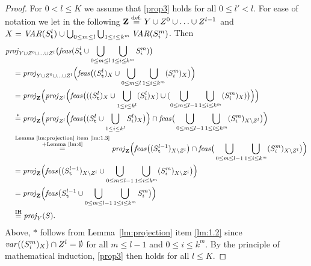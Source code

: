 \begin{proof}
For $0<l\leq K$ we assume that \eqref{prop3} holds for all $0\leq l'<l$. For ease of notation we let in the following $\mathbf{Z} \overset{\text{def.}}= Y\cup Z^0\cup\ldots\cup Z^{l-1}$ and $X = \mathit{VAR}(S^l_{\texttt{t}})\cup \bigcup_{0\leq m\leq l}\bigcup_{1\leq i\leq k^m}\mathit{VAR}(S^m_i)$. Then 
\begin{align*}
&\mathit{proj}_{Y\cup Z^0\cup\ldots\cup Z^l}\big(\mathit{feas}(S^l_{\texttt{t}}\cup\bigcup_{0\leq m\leq l}\bigcup_{1\leq i\leq k^m} S^m_i)\big)\\
&\quad=\mathit{proj}_{Y\cup Z^0\cup\ldots\cup Z^l}\Big(\mathit{feas}\big((S^l_{\texttt{t}})_X\cup\bigcup_{0\leq m\leq l}\bigcup_{1\leq i\leq k^m} (S^m_i)_X\big)\Big)\\
&\quad=\mathit{proj}_{\mathbf{Z}}\Big(\mathit{proj}_{Z^l}\Big(\mathit{feas}\big(((S^l_{\texttt{t}})_X\cup\bigcup_{1\leq i\leq k^l} (S_i^l)_X)\cup(\bigcup_{0\leq m\leq l-1}\bigcup_{1\leq i\leq k^m} (S^m_i)_X)\big)\Big)\Big)\\
&\quad\overset{*}=\mathit{proj}_{\mathbf{Z}}\Big(\mathit{proj}_{Z^l}\Big(\mathit{feas}\big((S^l_{\texttt{t}}\cup\bigcup_{1\leq i\leq k^l} S_i^l)_X\big)\Big)\cap\mathit{feas}\big(\bigcup_{0\leq m\leq l-1}\bigcup_{1\leq i\leq k^m} (S^m_i)_{X\setminus Z^l}\big)\Big)\\
&\quad\overset{\substack{\text{Lemma~\ref{lm:projection} item \ref{lm:1.3}}\\+\text{Lemma~\ref{lm:4}}}}
=\mathit{proj}_{\mathbf{Z}}\Big(\mathit{feas}\big((S^{l-1}_\texttt{t})_{X\setminus Z^l}\big)\cap\mathit{feas}\big(\bigcup_{0\leq m\leq l-1}\bigcup_{1\leq i\leq k^m} (S^m_i)_{X\setminus Z^l}\big)\Big)\\
&\quad=\mathit{proj}_{\mathbf{Z}}\Big(\mathit{feas}\big((S^{l-1}_{\texttt{t}})_{X\setminus Z^l}\cup\bigcup_{0\leq m\leq l-1}\bigcup_{1\leq i\leq k^m} (S^m_i)_{X\setminus Z^l}\big)\Big)\\
&\quad=\mathit{proj}_{\mathbf{Z}}\Big(\mathit{feas}\big(S^{l-1}_{\texttt{t}}\cup\bigcup_{0\leq m\leq l-1}\bigcup_{1\leq i\leq k^m} S^m_i\big)\Big)\\
&\quad\overset{\text{IH}}=\mathit{proj}_{Y}(S).
\end{align*}
Above, $*$ follows from Lemma~\ref{lm:projection} item \ref{lm:1.2} since $\mathit{var}((S^m_i)_X)\cap Z^l = \emptyset$ for all $m\leq l-1$ and $0\leq i\leq k^m$.
By the principle of mathematical induction, \eqref{prop3} then holds for all $l\leq K$. 
\end{proof}

